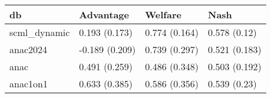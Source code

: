 \begin{tabular}{llll}
\toprule
db & Advantage & Welfare & Nash \\
\midrule
scml_dynamic & 0.193 (0.173) & 0.774 (0.164) & 0.578 (0.12) \\
anac2024 & -0.189 (0.209) & 0.739 (0.297) & 0.521 (0.183) \\
anac & 0.491 (0.259) & 0.486 (0.348) & 0.503 (0.192) \\
anac1on1 & 0.633 (0.385) & 0.586 (0.356) & 0.539 (0.23) \\
\bottomrule
\end{tabular}
